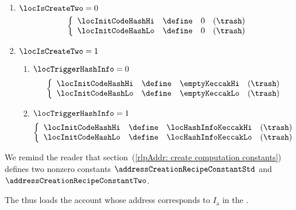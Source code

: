 \begin{description}
\begin{enumerate}
		        \item \If $\locIsCreateTwo = 0$ \Then 
				\[
					\left\{ \begin{array}{lclr}
						\locInitCodeHashHi & \define & 0 & (\trash) \\
						\locInitCodeHashLo & \define & 0 & (\trash) \\
					\end{array} \right.
				\]
		        \item \If $\locIsCreateTwo = 1$ \Then 
				\begin{enumerate}
				        \item \If $\locTriggerHashInfo = 0$
						\[
							\left\{ \begin{array}{lclr}
								\locInitCodeHashHi & \define & \emptyKeccakHi & (\trash) \\
								\locInitCodeHashLo & \define & \emptyKeccakLo & (\trash) \\
							\end{array} \right.
						\]
				        \item \If $\locTriggerHashInfo = 1$
						\[
							\left\{ \begin{array}{lclr}
								\locInitCodeHashHi & \define & \locHashInfoKeccakHi & (\trash) \\
								\locInitCodeHashLo & \define & \locHashInfoKeccakLo & (\trash) \\
							\end{array} \right.
						\]
				\end{enumerate}
		\end{enumerate}
		\saNote{} We remind the reader that section~(\ref{rlpAddr: create computation constants}) defines two nonzero constants $\addressCreationRecipeConstantStd$ and $\addressCreationRecipeConstantTwo$.
\end{description}
\saNote{} The \zkEvm{} thus loads the account whose address corresponds to $I_\text{a}$ in the \cite{EYP-London}.
